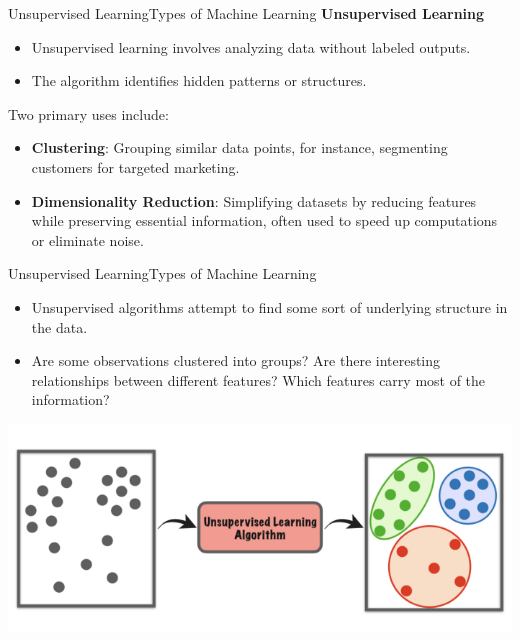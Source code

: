 \documentclass[11pt]{beamer}
\begin{document}
\begin{frame}{Unsupervised Learning}{Types of Machine Learning}
\textbf{Unsupervised Learning}
	\begin{itemize}
		\item Unsupervised learning involves analyzing data without labeled outputs. 

		\item The algorithm identifies hidden patterns or structures. 

	\end{itemize}
Two primary uses include:

	\begin{itemize}
		\item \textbf{Clustering}: Grouping similar data points, for instance, segmenting customers for targeted marketing.

		\item \textbf{Dimensionality Reduction}: Simplifying datasets by reducing features while preserving essential information, often used to speed up computations or eliminate noise.
	\end{itemize}
\end{frame}
\begin{frame}{Unsupervised Learning}{Types of Machine Learning}
\begin{itemize}
\item Unsupervised algorithms attempt to find some sort of underlying structure in the data. 

\item Are some observations clustered into groups? Are there interesting relationships between different features? Which features carry most of the information?
\end{itemize}
\begin{center}
\includegraphics[scale=.35]{../05-pictures/lesson-1-1_pic_22.png} 
\end{center}
\end{frame}
\end{document}
